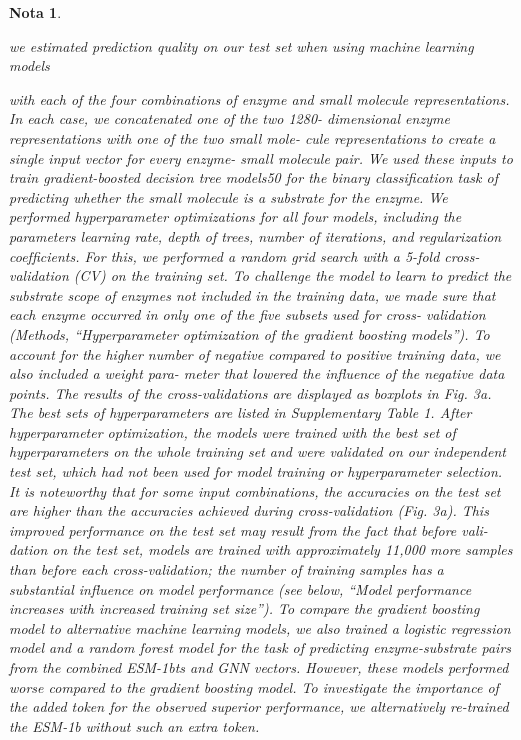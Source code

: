 \documentclass[12pt]{article}
\newtheorem{Note}{Nota}%
\begin{document}
\begin{Note}
\begin{itemize}
we estimated
prediction quality on our test set when using machine learning models

with each of the four combinations of enzyme and small molecule
representations. In each case, we concatenated one of the two 1280-
dimensional enzyme representations with one of the two small mole-
cule representations to create a single input vector for every enzyme-
small molecule pair. We used these inputs to train gradient-boosted
decision tree models50 for the binary classiﬁcation task of predicting
whether the small molecule is a substrate for the enzyme.
We performed hyperparameter optimizations for all four models,
including the parameters learning rate, depth of trees, number of
iterations, and regularization coefﬁcients. For this, we performed a
random grid search with a 5-fold cross-validation (CV) on the training
set. To challenge the model to learn to predict the substrate scope of
enzymes not included in the training data, we made sure that each
enzyme occurred in only one of the ﬁve subsets used for cross-
validation (Methods, “Hyperparameter optimization of the gradient
boosting models”). To account for the higher number of negative
compared to positive training data, we also included a weight para-
meter that lowered the inﬂuence of the negative data points. The
results of the cross-validations are displayed as boxplots in Fig. 3a. The
best sets of hyperparameters are listed in Supplementary Table 1. After
hyperparameter optimization, the models were trained with the best
set of hyperparameters on the whole training set and were validated on
our independent test set, which had not been used for model training
or hyperparameter selection. It is noteworthy that for some input
combinations, the accuracies on the test set are higher than the
accuracies achieved during cross-validation (Fig. 3a). This improved
performance on the test set may result from the fact that before vali-
dation on the test set, models are trained with approximately 11,000
more samples than before each cross-validation; the number of
training samples has a substantial inﬂuence on model performance
(see below, “Model performance increases with increased training
set size”). To compare the gradient boosting model to alternative machine
learning models, we also trained a logistic regression model and a
random forest model for the task of predicting enzyme-substrate pairs
from the combined ESM-1bts and GNN vectors. However, these models
performed worse compared to the gradient boosting model. To investigate the importance of the added token for the
observed superior performance, we alternatively re-trained the ESM-1b
without such an extra token.




\end{itemize}
\end{Note}
\end{document}
